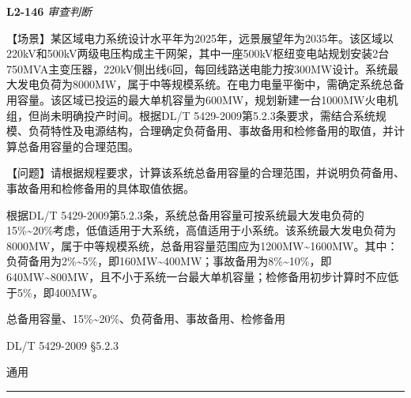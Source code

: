 \documentclass[12pt,a4paper]{ctexart}
\begin{document}
\noindent\textbf{L2-146} \hfill \textit{审查判断}
\begin{description}[leftmargin=1.5em,style=nextline,font=\normalfont]
  \item[Q:] 【场景】某区域电力系统设计水平年为2025年，远景展望年为2035年。该区域以220kV和500kV两级电压构成主干网架，其中一座500kV枢纽变电站规划安装2台750MVA主变压器，220kV侧出线6回，每回线路送电能力按300MW设计。系统最大发电负荷为8000MW，属于中等规模系统。在电力电量平衡中，需确定系统总备用容量。该区域已投运的最大单机容量为600MW，规划新建一台1000MW火电机组，但尚未明确投产时间。根据DL/T 5429-2009第5.2.3条要求，需结合系统规模、负荷特性及电源结构，合理确定负荷备用、事故备用和检修备用的取值，并计算总备用容量的合理范围。

【问题】请根据规程要求，计算该系统总备用容量的合理范围，并说明负荷备用、事故备用和检修备用的具体取值依据。
  \item[A:] 根据DL/T 5429-2009第5.2.3条，系统总备用容量可按系统最大发电负荷的15\%\textasciitilde{}20\%考虑，低值适用于大系统，高值适用于小系统。该系统最大发电负荷为8000MW，属于中等规模系统，总备用容量范围应为1200MW\textasciitilde{}1600MW。其中：负荷备用为2\%\textasciitilde{}5\%，即160MW\textasciitilde{}400MW；事故备用为8\%\textasciitilde{}10\%，即640MW\textasciitilde{}800MW，且不小于系统一台最大单机容量；检修备用初步计算时不应低于5\%，即400MW。
  \item[KW:] 总备用容量、15\%\textasciitilde{}20\%、负荷备用、事故备用、检修备用
  \item[Std:] DL/T 5429-2009 §5.2.3
  \item[Topic:] 通用
\end{description}
\vspace{4pt}
\hrule\vspace{6pt}
\end{document}
